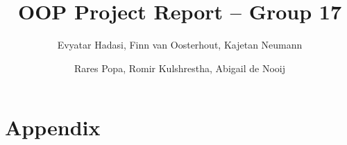 \documentclass[sigconf]{acmart}
\title{OOP Project Report -- Group 17}
\author{Evyatar Hadasi, Finn van Oosterhout, Kajetan Neumann}
\author{Rares Popa, Romir Kulshrestha, Abigail de Nooij}
\begin{document}
\begin{abstract}

\end{abstract}

\maketitle









\onecolumn
\section{Appendix}






\end{document}
